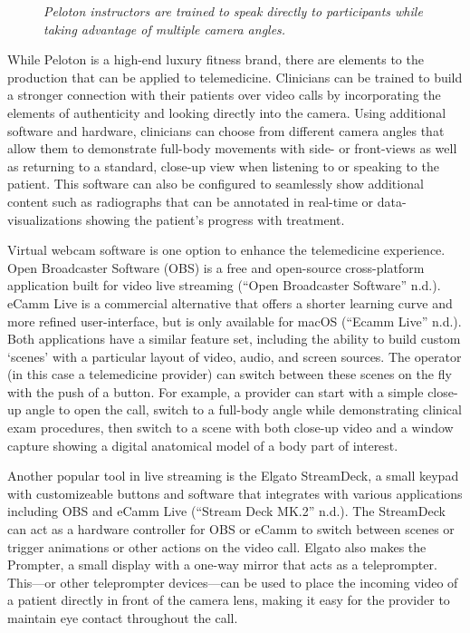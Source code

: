 \documentclass[
  letterpaper,
  DIV=11,
  numbers=noendperiod,
  oneside]{scrartcl}
\makeatletter
\newcommand*\pandocbounded[1]{%
  \sbox\pandoc@box{#1}%
  \Gscale@div\@tempa{\textheight}{\dimexpr\ht\pandoc@box+\dp\pandoc@box\relax}%
  \Gscale@div\@tempb{\linewidth}{\wd\pandoc@box}%
  \ifdim\@tempb\p@<\@tempa\p@\let\@tempa\@tempb\fi%
  \ifdim\@tempa\p@<\p@\scalebox{\@tempa}{\usebox\pandoc@box}%
  \else\usebox{\pandoc@box}%
  \fi%
}
\makeatother
\begin{document}
\begin{figure}[H]

{\centering \pandocbounded{\texttt{[image: PelotonWideRightShot.png]}}

}

\caption{\emph{Peloton instructors are trained to speak directly to
participants while taking advantage of multiple camera angles.}}

\end{figure}%

While Peloton is a high-end luxury fitness brand, there are elements to
the production that can be applied to telemedicine. Clinicians can be
trained to build a stronger connection with their patients over video
calls by incorporating the elements of authenticity and looking directly
into the camera. Using additional software and hardware, clinicians can
choose from different camera angles that allow them to demonstrate
full-body movements with side- or front-views as well as returning to a
standard, close-up view when listening to or speaking to the patient.
This software can also be configured to seamlessly show additional
content such as radiographs that can be annotated in real-time or
data-visualizations showing the patient's progress with treatment.

Virtual webcam software is one option to enhance the telemedicine
experience. Open Broadcaster Software (OBS) is a free and open-source
cross-platform application built for video live streaming ({``Open
{Broadcaster Software}''} n.d.). eCamm Live is a commercial alternative
that offers a shorter learning curve and more refined user-interface,
but is only available for macOS ({``Ecamm {Live}''} n.d.). Both
applications have a similar feature set, including the ability to build
custom `scenes' with a particular layout of video, audio, and screen
sources. The operator (in this case a telemedicine provider) can switch
between these scenes on the fly with the push of a button. For example,
a provider can start with a simple close-up angle to open the call,
switch to a full-body angle while demonstrating clinical exam
procedures, then switch to a scene with both close-up video and a window
capture showing a digital anatomical model of a body part of interest.

Another popular tool in live streaming is the Elgato StreamDeck, a small
keypad with customizeable buttons and software that integrates with
various applications including OBS and eCamm Live ({``Stream {Deck
MK}.2''} n.d.). The StreamDeck can act as a hardware controller for OBS
or eCamm to switch between scenes or trigger animations or other actions
on the video call. Elgato also makes the Prompter, a small display with
a one-way mirror that acts as a teleprompter. This---or other
teleprompter devices---can be used to place the incoming video of a
patient directly in front of the camera lens, making it easy for the
provider to maintain eye contact throughout the call.
\end{document}
